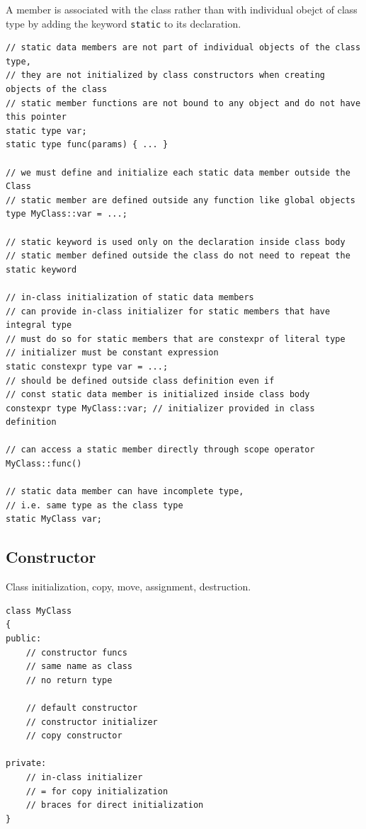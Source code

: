 \documentclass{blog}
\begin{document}
\begin{definition}
    A member is associated with the class rather than with individual obejct of class type
    by adding the keyword \verb|static| to its declaration.
    \begin{verbatim}
// static data members are not part of individual objects of the class type,
// they are not initialized by class constructors when creating objects of the class
// static member functions are not bound to any object and do not have this pointer
static type var;
static type func(params) { ... }

// we must define and initialize each static data member outside the Class
// static member are defined outside any function like global objects
type MyClass::var = ...;

// static keyword is used only on the declaration inside class body
// static member defined outside the class do not need to repeat the static keyword

// in-class initialization of static data members
// can provide in-class initializer for static members that have integral type
// must do so for static members that are constexpr of literal type
// initializer must be constant expression
static constexpr type var = ...;
// should be defined outside class definition even if
// const static data member is initialized inside class body
constexpr type MyClass::var; // initializer provided in class definition

// can access a static member directly through scope operator
MyClass::func()

// static data member can have incomplete type,
// i.e. same type as the class type
static MyClass var;
\end{verbatim}
\end{definition}

\subsection{Constructor}
\begin{definition}[constructor]
    Class initialization, copy, move, assignment, destruction.
    \begin{verbatim}
class MyClass
{
public:
    // constructor funcs
    // same name as class
    // no return type

    // default constructor
    // constructor initializer
    // copy constructor

private:
    // in-class initializer
    // = for copy initialization
    // braces for direct initialization
}
\end{verbatim}
\end{definition}
\end{document}
